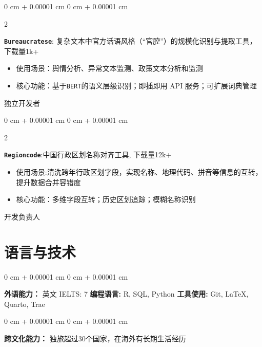 \documentclass[10pt, letterpaper]{article}
\newenvironment{onecolentry}{
    \begin{adjustwidth}{
        0 cm + 0.00001 cm
    }{
        0 cm + 0.00001 cm
    }
}{
    \end{adjustwidth}
} %
\newenvironment{twocolentry}[2][]{
    \onecolentry
    \def\secondColumn{#2}
    \setcolumnwidth{\fill, 2.5 cm}
    \begin{paracol}{2}
}{
    \switchcolumn \raggedleft \secondColumn
    \end{paracol}
    \endonecolentry
} %
\begin{document}
        \begin{twocolentry}{
            独立开发者
        }
        \textbf{\texttt{Bureaucratese}}:
        复杂文本中官方话语风格（“官腔”）的规模化识别与提取工具，下载量1k+

        \begin{itemize}[
            topsep=0.005cm,   %
            parsep=0.005cm,   %
            partopsep=0pt,    %
            itemsep=0pt,      %
            leftmargin=0cm + 10pt
        ]
        \item 使用场景：舆情分析、异常文本监测、政策文本分析和监测
        \item 核心功能：基于\texttt{BERT}的语义层级识别；即插即用 API 服务；可扩展词典管理

        \end{itemize}
        \end{twocolentry}

        \begin{twocolentry}{
            开发负责人
        }
        \textbf{\texttt{Regioncode}}:中国行政区划名称对齐工具, 下载量12k+
        
        \begin{itemize}[
            topsep=0.005cm,   %
            parsep=0.005cm,   %
            partopsep=0pt,    %
            itemsep=0pt,      %
            leftmargin=0cm + 10pt
        ]
        \item 使用场景:清洗跨年行政区划字段，实现名称、地理代码、拼音等信息的互转，提升数据合并容错度

        \item 核心功能：多维字段互转；历史区划追踪；模糊名称识别

        \end{itemize}
        
    \end{twocolentry}



    
    \section{语言与技术}

        \begin{onecolentry}
            \textbf{外语能力：} 英文 IELTS: 7 \hspace{5em}
            \textbf{编程语言:} R, SQL, Python \hspace{5em}
            \textbf{工具使用:} Git, \LaTeX, Quarto, Trae
        \end{onecolentry}

        \begin{onecolentry}
            \textbf{跨文化能力：} 独旅超过30个国家，在海外有长期生活经历\hspace{5em}
        \end{onecolentry}
\end{document}
